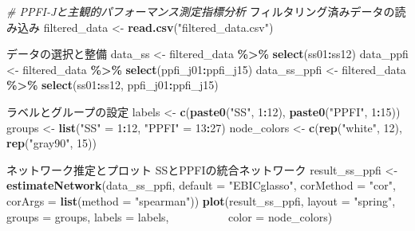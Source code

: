 \documentclass[12pt,a4paper,xelatex,ja=standard]{bxjsarticle}
\newenvironment{Shaded}{\begin{snugshade}}{\end{snugshade}}
\newcommand{\AttributeTok}[1]{\textcolor[rgb]{0.13,0.29,0.53}{#1}}
\newcommand{\CommentTok}[1]{\textcolor[rgb]{0.56,0.35,0.01}{\textit{#1}}}
\newcommand{\DecValTok}[1]{\textcolor[rgb]{0.00,0.00,0.81}{#1}}
\newcommand{\FunctionTok}[1]{\textcolor[rgb]{0.13,0.29,0.53}{\textbf{#1}}}
\newcommand{\NormalTok}[1]{#1}
\newcommand{\OtherTok}[1]{\textcolor[rgb]{0.56,0.35,0.01}{#1}}
\newcommand{\SpecialCharTok}[1]{\textcolor[rgb]{0.81,0.36,0.00}{\textbf{#1}}}
\newcommand{\StringTok}[1]{\textcolor[rgb]{0.31,0.60,0.02}{#1}}
\begin{document}
\begin{Shaded}
\begin{Highlighting}[]
\CommentTok{\# PPFI{-}Jと主観的パフォーマンス測定指標分析}
\NormalTok{フィルタリング済みデータの読み込み}
\NormalTok{filtered\_data }\OtherTok{\textless{}{-}} \FunctionTok{read.csv}\NormalTok{(}\StringTok{"filtered\_data.csv"}\NormalTok{)}

\NormalTok{データの選択と整備}
\NormalTok{data\_ss }\OtherTok{\textless{}{-}}\NormalTok{ filtered\_data }\SpecialCharTok{\%\textgreater{}\%} 
  \FunctionTok{select}\NormalTok{(ss01}\SpecialCharTok{:}\NormalTok{ss12)}
\NormalTok{data\_ppfi }\OtherTok{\textless{}{-}}\NormalTok{ filtered\_data }\SpecialCharTok{\%\textgreater{}\%} 
  \FunctionTok{select}\NormalTok{(ppfi\_j01}\SpecialCharTok{:}\NormalTok{ppfi\_j15)}
\NormalTok{data\_ss\_ppfi }\OtherTok{\textless{}{-}}\NormalTok{ filtered\_data }\SpecialCharTok{\%\textgreater{}\%} 
  \FunctionTok{select}\NormalTok{(ss01}\SpecialCharTok{:}\NormalTok{ss12, ppfi\_j01}\SpecialCharTok{:}\NormalTok{ppfi\_j15)}

\NormalTok{ラベルとグループの設定}
\NormalTok{labels }\OtherTok{\textless{}{-}} \FunctionTok{c}\NormalTok{(}\FunctionTok{paste0}\NormalTok{(}\StringTok{"SS"}\NormalTok{, }\DecValTok{1}\SpecialCharTok{:}\DecValTok{12}\NormalTok{), }\FunctionTok{paste0}\NormalTok{(}\StringTok{"PPFI"}\NormalTok{, }\DecValTok{1}\SpecialCharTok{:}\DecValTok{15}\NormalTok{))}
\NormalTok{groups }\OtherTok{\textless{}{-}} \FunctionTok{list}\NormalTok{(}\StringTok{"SS"} \OtherTok{=} \DecValTok{1}\SpecialCharTok{:}\DecValTok{12}\NormalTok{, }\StringTok{"PPFI"} \OtherTok{=} \DecValTok{13}\SpecialCharTok{:}\DecValTok{27}\NormalTok{)}
\NormalTok{node\_colors }\OtherTok{\textless{}{-}} \FunctionTok{c}\NormalTok{(}\FunctionTok{rep}\NormalTok{(}\StringTok{"white"}\NormalTok{, }\DecValTok{12}\NormalTok{), }\FunctionTok{rep}\NormalTok{(}\StringTok{"gray90"}\NormalTok{, }\DecValTok{15}\NormalTok{))}

\NormalTok{ネットワーク推定とプロット}
\NormalTok{SSとPPFIの統合ネットワーク}
\NormalTok{result\_ss\_ppfi }\OtherTok{\textless{}{-}} \FunctionTok{estimateNetwork}\NormalTok{(data\_ss\_ppfi, }
                                  \AttributeTok{default =} \StringTok{"EBICglasso"}\NormalTok{, }
                \AttributeTok{corMethod =} \StringTok{"cor"}\NormalTok{, }
                \AttributeTok{corArgs =} \FunctionTok{list}\NormalTok{(}\AttributeTok{method =} \StringTok{"spearman"}\NormalTok{))}
\FunctionTok{plot}\NormalTok{(result\_ss\_ppfi, }\AttributeTok{layout =} \StringTok{"spring"}\NormalTok{,}
     \AttributeTok{groups =}\NormalTok{ groups, }\AttributeTok{labels =}\NormalTok{ labels, }
     　　　　　\AttributeTok{color =}\NormalTok{ node\_colors)}


\end{Highlighting}
\end{Shaded}
\end{document}
